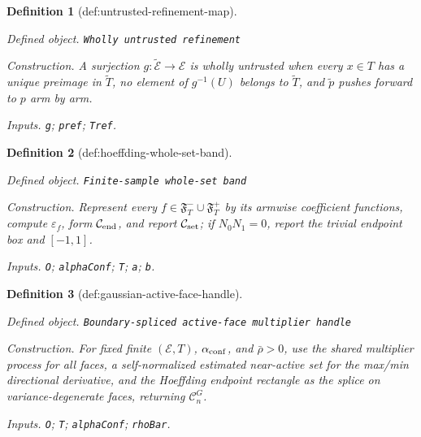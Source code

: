 \documentclass{article}
\newtheorem{definition}{Definition}
\begin{document}
\begin{definition}[def:untrusted-refinement-map]\label{def:untrusted-refinement-map}
\par\smallskip\noindent\emph{Defined object.} \texttt{Wholly untrusted refinement}
\par\smallskip\noindent\emph{Construction.} A surjection \(g:\widetilde{\mathcal E}\to\mathcal E\) is wholly untrusted when every \(x\in T\) has a unique preimage in \(\widetilde T\), no element of \(g^{-1}(U)\) belongs to \(\widetilde T\), and \(\widetilde p\) pushes forward to \(p\) arm by arm.
\par\smallskip\noindent\emph{Inputs.} \texttt{g}; \texttt{pref}; \texttt{Tref}.
\end{definition}

\begin{definition}[def:hoeffding-whole-set-band]\label{def:hoeffding-whole-set-band}
\par\smallskip\noindent\emph{Defined object.} \texttt{Finite-\allowbreak{}sample whole-\allowbreak{}set band}
\par\smallskip\noindent\emph{Construction.} Represent every \(f\in\mathfrak F^-_T\cup\mathfrak F^+_T\) by its armwise coefficient functions, compute \(\varepsilon_f\), form \(\mathcal C_{\rm end}\), and report \(\mathcal C_{\rm set}\); if \(N_0N_1=0\), report the trivial endpoint box and \([-1,1]\).
\par\smallskip\noindent\emph{Inputs.} \texttt{O}; \texttt{alphaConf}; \texttt{T}; \texttt{a}; \texttt{b}.
\end{definition}

\begin{definition}[def:gaussian-active-face-handle]\label{def:gaussian-active-face-handle}
\par\smallskip\noindent\emph{Defined object.} \texttt{Boundary-\allowbreak{}spliced active-\allowbreak{}face multiplier handle}
\par\smallskip\noindent\emph{Construction.} For fixed finite \((\mathcal E,T)\), \(\alpha_{\rm conf}\), and \(\bar\rho>0\), use the shared multiplier process for all faces, a self-normalized estimated near-active set for the max/min directional derivative, and the Hoeffding endpoint rectangle as the splice on variance-degenerate faces, returning \(\mathcal C^G_n\).
\par\smallskip\noindent\emph{Inputs.} \texttt{O}; \texttt{T}; \texttt{alphaConf}; \texttt{rhoBar}.
\end{definition}
\end{document}
